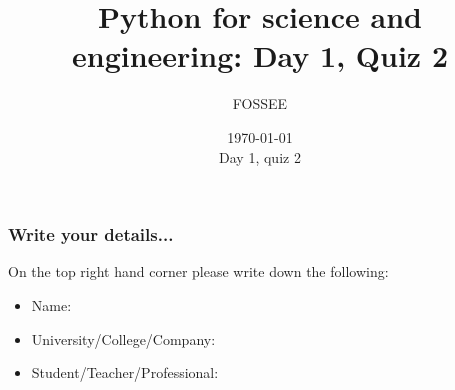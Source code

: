 \documentclass[14pt,compress]{beamer}
\title[Basic Python]{Python for science and engineering: Day 1, Quiz 2}
\author[FOSSEE Team] {FOSSEE}
\institute[IIT Bombay] {Department of Aerospace Engineering\\IIT Bombay}
\date[] {\today \\
Day 1, quiz 2}
\begin{document}
\begin{frame}
  \titlepage
\end{frame}

\begin{frame}
  \frametitle{Write your details...}
On the top right hand corner please write down the following:
  \begin{itemize}
    \item Name:
    \item University/College/Company:
    \item Student/Teacher/Professional:
  \end{itemize}
\end{frame}
\end{document}
